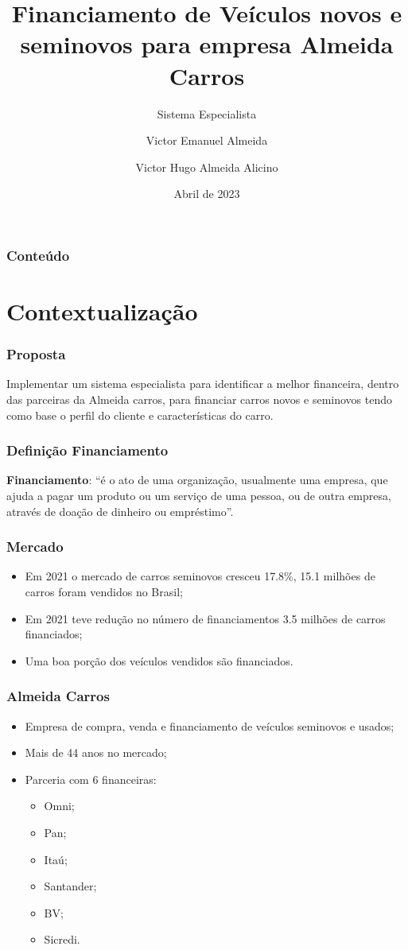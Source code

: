 \documentclass[12pt]{beamer}
\author[Victor * Almeida *]{Victor Emanuel Almeida \and Victor Hugo Almeida Alicino}
\title[Financiamento de veículos]{Financiamento de Veículos novos e seminovos para empresa Almeida Carros}
\subtitle{Sistema Especialista}
\date{Abril de 2023}
\institute{UNIOESTE}
\begin{document}
\frame{\titlepage}

\begin{frame}
    \frametitle{Conteúdo}
    \tableofcontents
\end{frame}

\section{Contextualização}
\begin{frame}
    \frametitle{Proposta}

    \large Implementar um sistema especialista para identificar a melhor financeira, dentro das parceiras da Almeida carros, para financiar carros novos e seminovos tendo como base o perfil do cliente e características do carro.

\end{frame}

\begin{frame}
    \frametitle{Definição Financiamento}
    \textbf{Financiamento}: ``é o ato de uma organização, usualmente uma empresa, que ajuda a pagar um produto ou um serviço de uma pessoa, ou de outra empresa, através de doação de dinheiro ou empréstimo''\cite{financiamento}.
\end{frame}

\begin{frame}
    \frametitle{Mercado}
    \begin{itemize}
        \item Em 2021 o mercado de carros seminovos cresceu 17.8\%, 15.1 milhões de carros foram vendidos no Brasil\cite{mercado_seminovos};
        \item Em 2021 teve redução no número de financiamentos 3.5 milhões de carros financiados\cite{financiamento_2022};
        \item Uma boa porção dos veículos vendidos são financiados.
    \end{itemize}
\end{frame}

\begin{frame}
    \frametitle{Almeida Carros}
    \begin{itemize}
        \item Empresa de compra, venda e financiamento de veículos seminovos e usados;
        \item Mais de 44 anos no mercado;
        \item Parceria com 6 financeiras:
        \begin{itemize}
            \item Omni;
            \item Pan;
            \item Itaú;
            \item Santander;
            \item BV;
            \item Sicredi.
        \end{itemize}
    \end{itemize}
\end{frame}
\end{document}
